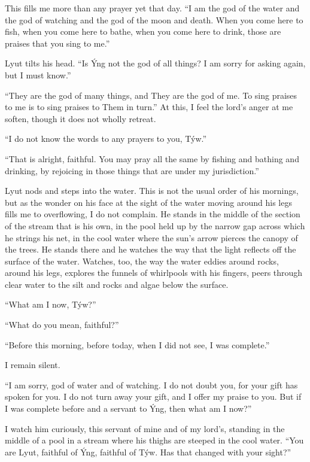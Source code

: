 This fills me more than any prayer yet that day. ``I am the god of the water and the god of watching and the god of the moon and death. When you come here to fish, when you come here to bathe, when you come here to drink, those are praises that you sing to me.''

Lyut tilts his head. ``Is Ýng not the god of all things? I am sorry for asking again, but I must know.''

``They are the god of many things, and They are the god of me. To sing praises to me is to sing praises to Them in turn.'' At this, I feel the lord's anger at me soften, though it does not wholly retreat.

``I do not know the words to any prayers to you, Týw.''

``That is alright, faithful. You may pray all the same by fishing and bathing and drinking, by rejoicing in those things that are under my jurisdiction.''

Lyut nods and steps into the water. This is not the usual order of his mornings, but as the wonder on his face at the sight of the water moving around his legs fills me to overflowing, I do not complain. He stands in the middle of the section of the stream that is his own, in the pool held up by the narrow gap across which he strings his net, in the cool water where the sun's arrow pierces the canopy of the trees. He stands there and he watches the way that the light reflects off the surface of the water. Watches, too, the way the water eddies around rocks, around his legs, explores the funnels of whirlpools with his fingers, peers through clear water to the silt and rocks and algae below the surface.

``What am I now, Týw?''

``What do you mean, faithful?''

``Before this morning, before today, when I did not see, I was complete.''

I remain silent.

``I am sorry, god of water and of watching. I do not doubt you, for your gift has spoken for you. I do not turn away your gift, and I offer my praise to you. But if I was complete before and a servant to Ýng, then what am I now?''

I watch him curiously, this servant of mine and of my lord's, standing in the middle of a pool in a stream where his thighs are steeped in the cool water. ``You are Lyut, faithful of Ýng, faithful of Týw. Has that changed with your sight?''

